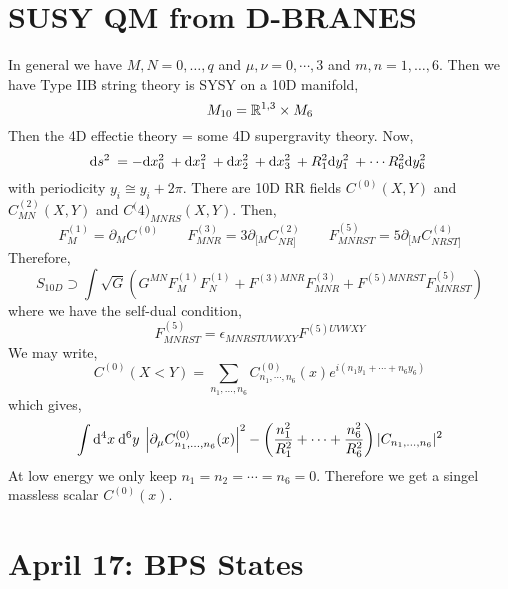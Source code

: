 \documentclass[12pt]{extarticle}
\begin{document}
\section{SUSY QM from D-BRANES}

In general we have $M,N = 0, \dots, q$ and $\mu, \nu = 0, \cdots, 3$ and $m,n = 1, \dots, 6$. Then we have Type IIB string theory is SYSY on a 10D manifold,
\[ M_{10} = \mathbb{R}^{1,3} \times M_6 \]
Then the 4D effectie theory = some 4D supergravity theory. Now,
\[ \mathrm{d}s^2 \: = - \mathrm{d}x_0^2 \: + \mathrm{d}x_1^2 \: + \mathrm{d}x_2^2 \: + \mathrm{d}x_3^2 \: + R_1^2 \mathrm{d}y_1^2 \: + \cdots R_6^2 \mathrm{d}y_6^2 \: \]
with periodicity $y_i \cong y_i + 2 \pi$. There are 10D RR fields $C^{(0)}(X,Y)$ and $C^{(2)}_{MN}(X,Y)$ and $C^({4)}_{MNRS}(X,Y)$. Then,
\[ F_M^{(1)} = \partial_M C^{(0)} \quad \quad F^{(3)}_{MNR} = 3 \partial_{[M} C^{(2)}_{NR]} \quad \quad F^{(5)}_{MNRST} = 5 \partial_{[M} C^{(4)}_{NRST]} \]
Therefore,
\[ S_{10D} \supset \int \sqrt{G} \left( G^{MN} F^{(1)}_M F^{(1)}_N + F^{(3) MNR} F^{(3)}_{MNR} + F^{(5) MNRST} F^{(5)}_{MNRST}  \right) \] 
where we have the self-dual condition,
\[ F^{(5)}_{MNRST} = \epsilon_{MNRSTUVWXY} F^{(5) UVWXY} \]
We may write,
\[ C^{(0)}(X<Y) = \sum_{n_1, \dots, n_6} C^{(0)}_{n_1, \cdots, n_6}(x) e^{i(n_1 y_1 + \cdots + n_6 y_6)} \]
which gives,
\[ \int \mathrm{d}^{4} x \: \mathrm{d}^{6} y \: \left| \partial_\mu C^{(0)}_{n_1, \dots, n_6}(x) \right|^2 - \left( \frac{n_1^2}{R_1^2} + \cdots + \frac{n_6^2}{R_6^2} \right) | C_{n_1, \dots, n_6} |^2 \]
At low energy we only keep $n_1 = n_2 =\cdots = n_6 = 0$. Therefore we get a singel massless scalar $C^{(0)}(x)$. 


\section{April 17: BPS States}
\end{document}
